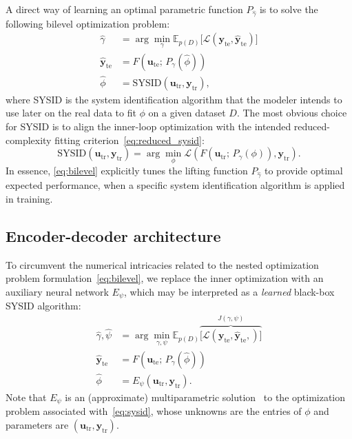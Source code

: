 \documentclass{article}
\newcommand{\tr}{\mathrm{tr}}
\newcommand{\te}{\mathrm{te}}
\newcommand{\seq}[1]{{\mathbf{#1}}}
\newcommand{\D}{D}
\newcommand{\E}{\mathbb{E}} %
\newcommand{\redpar}{\phi}
\newcommand{\projpar}{\gamma}
\newcommand{\encpar}{\psi}
\newcommand{\loss}{\mathcal{L}}
\begin{document}
A direct way of learning an optimal parametric function $P_{\hat \projpar}$ is to solve
the following bilevel optimization problem:
\begin{subequations}
\label{eq:bilevel}
\begin{align}
\hat \projpar &= \arg \min_{\projpar} \E_{p(\D)}
\big [ \loss({\seq y}_\te, \hat {\seq y}_\te) \big ]\\
\hat{\seq{y}}_\te  &= F\left(
  \seq{u}_\te ; \,
  P_{\projpar} ( \hat \redpar  )
\right)\\
  \hat \redpar &=
  \text{SYSID}(\seq u_\tr , \seq y_\tr ),\label{eq:sysid}
\end{align}
\end{subequations}
where SYSID is the system identification algorithm that the modeler intends to use later on the real data
to fit $\phi$ on a given dataset $D$.  The most obvious choice for SYSID is to align the inner-loop optimization 
with the intended reduced-complexity fitting criterion~\eqref{eq:reduced_sysid}:
\begin{equation}
\label{eq:inner_optimization}
\mathrm{SYSID} (\seq u_\tr , \seq y_\tr ) = 
\arg \min_\phi \loss(F(\seq u_\tr ; \, P_\projpar(\redpar)), \seq y_\tr ).
\end{equation}
In essence, \eqref{eq:bilevel} explicitly tunes the lifting function $P_{\hat \gamma}$ to provide optimal expected performance, when a specific system identification algorithm is applied in training.

\subsection{Encoder-decoder architecture}
\label{enc_dec_hypernet}
To circumvent the numerical intricacies related to the nested optimization problem formulation~\eqref{eq:bilevel}, we replace the inner optimization with an auxiliary neural network $E_{\psi}$, which may be interpreted as a \emph{learned} black-box SYSID algorithm:
\begin{subequations}
\label{eq:hypernet}
\begin{align}
\hat \projpar, \hat \encpar &= \arg \min_{\projpar, \encpar} \E_{p(\D)} 
\overbrace{\big [ \loss({\seq y}_\te, \hat {\seq y}_\te,) \big ]}^{J(\gamma, \psi)} \label{eq:hypernet_a}\\
\hat{\seq{y}}_\te  &= F\left(
  \seq{u}_\te ; \,
  P_{\projpar} ( \hat \redpar )
\right) \label{eq:decoder}\\
  \hat \redpar &=
  E_{\psi}(\seq u_\tr , \seq y_\tr ) \label{eq:encoder}.
\end{align}
\end{subequations}
Note that $E_{\psi}$ is an (approximate) multiparametric solution~\cite{Fia83} to the optimization problem associated with~\eqref{eq:sysid}, whose unknowns are the entries of $\redpar$ and parameters are $(\seq u_\tr , \seq y_\tr )$.
\end{document}
